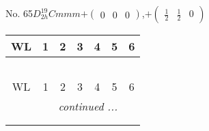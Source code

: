 \documentclass[fleqn,9pt,landscape]{jsarticle}
\begin{document}
\newpage
No. 65\quad$D_{2h}^{19}$\quad$Cmmm$\quad[ orthorhombic ]\quad$+\begin{pmatrix} 0 & 0 & 0 \end{pmatrix}$,\quad $+\begin{pmatrix} \frac{1}{2} & \frac{1}{2} & 0 \end{pmatrix}$
\begin{center}
\renewcommand{\arraystretch}{1.2}
\begin{longtable}{ccccccc}
 \hline \hline
WL & 1 & 2 & 3 & 4 & 5 & 6 \\ \hline \endfirsthead

\multicolumn{6}{l}{\tablename\ \thetable{}} \\
 \hline \hline
WL & 1 & 2 & 3 & 4 & 5 & 6 \\ \hline \endhead

 \hline \hline
\multicolumn{6}{r}{\footnotesize\it continued ...} \\ \endfoot

 \hline \hline
\multicolumn{6}{r}{} \\ \endlastfoot


\end{longtable}
\end{center}
\end{document}

